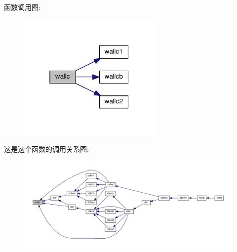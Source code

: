 函数调用图\+:
\nopagebreak
\begin{figure}[H]
\begin{center}
\leavevmode
\includegraphics[width=199pt]{wallc_8f90_ade0bbe7488fb80deb14ff1f8c2d8d8dc_cgraph}
\end{center}
\end{figure}
这是这个函数的调用关系图\+:
\nopagebreak
\begin{figure}[H]
\begin{center}
\leavevmode
\includegraphics[width=350pt]{wallc_8f90_ade0bbe7488fb80deb14ff1f8c2d8d8dc_icgraph}
\end{center}
\end{figure}
